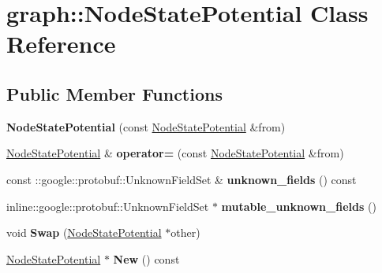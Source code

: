 \hypertarget{classgraph_1_1NodeStatePotential}{
\section{graph::NodeStatePotential Class Reference}
\label{classgraph_1_1NodeStatePotential}
}
\subsection*{Public Member Functions}
\begin{DoxyCompactItemize}
\item 
\hypertarget{classgraph_1_1NodeStatePotential_abe93f0f8c63b6b1861903c72d29bf718}{
{\bfseries NodeStatePotential} (const \hyperlink{classgraph_1_1NodeStatePotential}{NodeStatePotential} \&from)}
\label{classgraph_1_1NodeStatePotential_abe93f0f8c63b6b1861903c72d29bf718}

\item 
\hypertarget{classgraph_1_1NodeStatePotential_a004077f286e88ffafc8b40300d44e201}{
\hyperlink{classgraph_1_1NodeStatePotential}{NodeStatePotential} \& {\bfseries operator=} (const \hyperlink{classgraph_1_1NodeStatePotential}{NodeStatePotential} \&from)}
\label{classgraph_1_1NodeStatePotential_a004077f286e88ffafc8b40300d44e201}

\item 
\hypertarget{classgraph_1_1NodeStatePotential_add63ea9eec1f3caff6ee19c4525e5972}{
const ::google::protobuf::UnknownFieldSet \& {\bfseries unknown\_\-fields} () const }
\label{classgraph_1_1NodeStatePotential_add63ea9eec1f3caff6ee19c4525e5972}

\item 
\hypertarget{classgraph_1_1NodeStatePotential_abb591e0b424e774040f8109c92413f0d}{
inline::google::protobuf::UnknownFieldSet $\ast$ {\bfseries mutable\_\-unknown\_\-fields} ()}
\label{classgraph_1_1NodeStatePotential_abb591e0b424e774040f8109c92413f0d}

\item 
\hypertarget{classgraph_1_1NodeStatePotential_a13b774b1f32294830d162db5e80eb3b7}{
void {\bfseries Swap} (\hyperlink{classgraph_1_1NodeStatePotential}{NodeStatePotential} $\ast$other)}
\label{classgraph_1_1NodeStatePotential_a13b774b1f32294830d162db5e80eb3b7}

\item 
\hypertarget{classgraph_1_1NodeStatePotential_af5fd80aeb33df9a2d08e6fe6b2f6b0e5}{
\hyperlink{classgraph_1_1NodeStatePotential}{NodeStatePotential} $\ast$ {\bfseries New} () const }
\label{classgraph_1_1NodeStatePotential_af5fd80aeb33df9a2d08e6fe6b2f6b0e5}


\end{DoxyCompactItemize}
